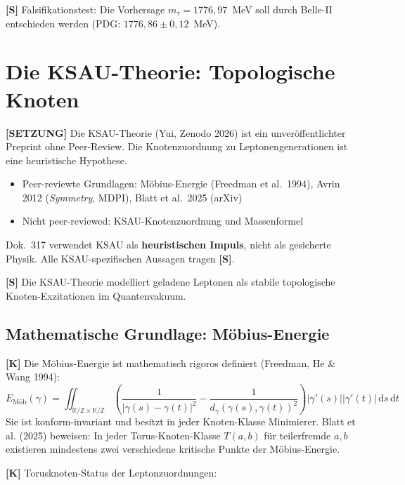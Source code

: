 \textbf{[S]} Falsifikationstest: Die Vorhersage $m_\tau = 1776{,}97$~MeV
soll durch Belle-II entschieden werden (PDG: $1776{,}86 \pm 0{,}12$~MeV).

\section{Die KSAU-Theorie: Topologische Knoten}

\begin{tcolorbox}[colback=orange!8!white,colframe=orange!60!black,
  title=Wissenschaftlicher Status der KSAU-Theorie]
\textbf{[SETZUNG]} Die KSAU-Theorie (Yui, Zenodo 2026) ist ein
unveröffentlichter Preprint ohne Peer-Review. Die Knotenzuordnung
zu Leptonengenerationen ist eine heuristische Hypothese.
\begin{itemize}
  \item Peer-reviewte Grundlagen: Möbius-Energie (Freedman et al.\ 1994),
    Avrin 2012 (\emph{Symmetry}, MDPI), Blatt et al.\ 2025 (arXiv)
  \item Nicht peer-reviewed: KSAU-Knotenzuordnung und Massenformel
\end{itemize}
Dok.~317 verwendet KSAU als \textbf{heuristischen Impuls}, nicht als
gesicherte Physik. Alle KSAU-spezifischen Aussagen tragen \textbf{[S]}.
\end{tcolorbox}

\textbf{[S]} Die KSAU-Theorie modelliert geladene Leptonen als stabile
topologische Knoten-Exzitationen im Quantenvakuum.

\subsection{Mathematische Grundlage: Möbius-Energie}

\textbf{[K]} Die Möbius-Energie ist mathematisch rigoros definiert
(Freedman, He \& Wang 1994):
\begin{equation}
  E_{\text{Möb}}(\gamma) = \iint_{\mathbb{R}/\mathbb{Z}\times\mathbb{R}/\mathbb{Z}}
  \left(\frac{1}{|\gamma(s)-\gamma(t)|^2}
  - \frac{1}{d_\gamma(\gamma(s),\gamma(t))^2}\right)
  |\gamma'(s)||\gamma'(t)|\,\mathrm{d}s\,\mathrm{d}t
\end{equation}
Sie ist konform-invariant und besitzt in jeder Knoten-Klasse
Minimierer. Blatt et al. (2025) beweisen: In jeder Torus-Knoten-Klasse
$T(a,b)$ für teilerfremde $a,b$ existieren mindestens zwei
verschiedene kritische Punkte der Möbius-Energie.

\textbf{[K]} Torusknoten-Status der Leptonzuordnungen:

